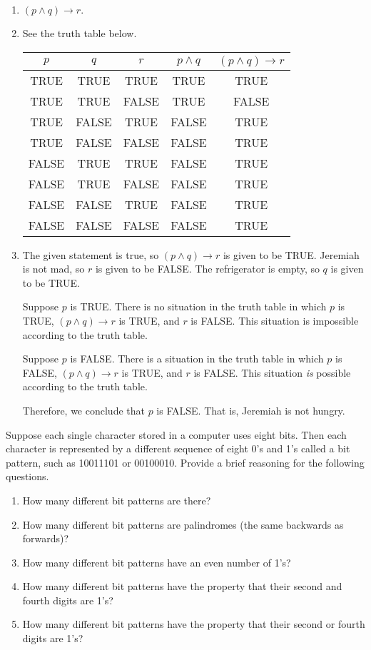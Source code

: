 \documentclass{article}
\theoremstyle{definition}
\begin{document}
\begin{solution}\begin{enumerate}
    \item$(p\land q)\rightarrow r.$
    \item See the truth table below.
    
\begin{center}\begin{tabular}{c|c|c||c||c}
$p$&$q$&$r$&$p\land q$&$(p\land q)\rightarrow r$\\\hline
TRUE&TRUE&TRUE&TRUE&TRUE\\
TRUE&TRUE&FALSE&TRUE&FALSE\\
TRUE&FALSE&TRUE&FALSE&TRUE\\
TRUE&FALSE&FALSE&FALSE&TRUE\\
FALSE&TRUE&TRUE&FALSE&TRUE\\
FALSE&TRUE&FALSE&FALSE&TRUE\\
FALSE&FALSE&TRUE&FALSE&TRUE\\
FALSE&FALSE&FALSE&FALSE&TRUE\\
\end{tabular}\end{center}
\item The given statement is true, so $(p\land q)\rightarrow r$ is given to be TRUE. Jeremiah is not mad, so $r$ is given to be FALSE. The refrigerator is empty, so $q$ is given to be TRUE.

Suppose $p$ is TRUE. There is no situation in the truth table in which $p$ is TRUE, $(p\land q)\rightarrow r$ is TRUE, and $r$ is FALSE. This situation is impossible according to the truth table.

Suppose $p$ is FALSE. There is a situation in the truth table in which $p$ is FALSE, $(p\land q)\rightarrow r$ is TRUE, and $r$ is FALSE. This situation \textit{is} possible according to the truth table.

Therefore, we conclude that $p$ is FALSE. That is, Jeremiah is not hungry.

\end{enumerate}\end{solution}
\begin{question}
    Suppose each single character stored in a computer uses eight bits. 
    Then each character is represented by a different sequence of eight 0's and 1's called a bit pattern, 
    such as 10011101 or 00100010. Provide a brief reasoning for the following questions.
        \begin{enumerate}
            \item How many different bit patterns are there?
            \item How many different bit patterns are palindromes (the same backwards as forwards)?
            \item How many different bit patterns have an even number of 1's?
            \item How many different bit patterns have the property that their second and fourth digits are 1's?
            \item How many different bit patterns have the property that their second or fourth digits are 1's?
        \end{enumerate}
\end{question}
\end{document}
